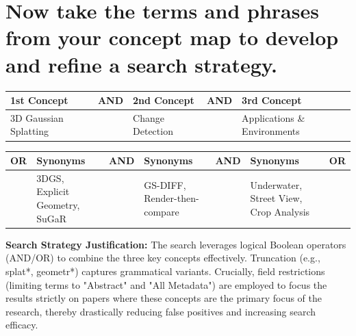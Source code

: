 \documentclass[12pt, a4paper]{article}
\begin{document}
\section*{Now take the terms and phrases from your concept map to develop and refine a search strategy.}
\begin{table}[h]
\centering
\renewcommand{\arraystretch}{1.5}
\begin{tabular}{|>{\centering\arraybackslash}p{3.5cm}|c|>{\centering\arraybackslash}p{3.5cm}|c|>{\centering\arraybackslash}p{3.5cm}|}
\hline
1st Concept & AND & 2nd Concept & AND & 3rd Concept \\
\hline
3D Gaussian Splatting & & Change Detection & & Applications \& Environments \\[1.5cm]
\hline
\end{tabular}
\end{table}


\begin{table}[h]
\centering
\renewcommand{\arraystretch}{1.5}
\begin{tabular}{|c|>{\centering\arraybackslash}p{3.5cm}|c|>{\centering\arraybackslash}p{3.5cm}|c|>{\centering\arraybackslash}p{3.5cm}|c|}
\hline
OR & Synonyms & AND & Synonyms & AND & Synonyms & OR \\
\hline
 & 3DGS, Explicit Geometry, SuGaR & & GS-DIFF, Render-then-compare & & Underwater, Street View, Crop Analysis & \\[1.5cm]
\hline
\end{tabular}
\end{table}

\begin{center}
\end{center}

\begin{center}
\end{center}
\vspace{0.2cm}
\noindent\textbf{Search Strategy Justification:} The search leverages logical Boolean operators (AND/OR) to combine the three key concepts effectively. Truncation (e.g., splat*, geometr*) captures grammatical variants. Crucially, field restrictions (limiting terms to "Abstract" and "All Metadata") are employed to focus the results strictly on papers where these concepts are the primary focus of the research, thereby drastically reducing false positives and increasing search efficacy.
\end{document}
